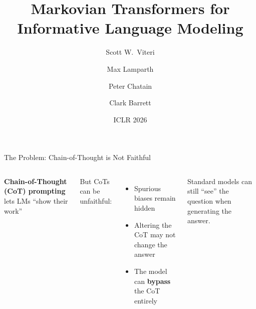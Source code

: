 \documentclass[aspectratio=169]{beamer}
\title{Markovian Transformers for\\Informative Language Modeling}
\author{Scott W.\ Viteri \and Max Lamparth \and Peter Chatain \and Clark Barrett}
\institute{Department of Computer Science, Stanford University}
\date{ICLR 2026}
\begin{document}
\begin{frame}[plain]
\maketitle
\end{frame}

\begin{frame}{The Problem: Chain-of-Thought is Not Faithful}

\begin{columns}[T]
\textbf{Chain-of-Thought (CoT) prompting} lets LMs ``show their work''
\citep{wei2022chain, nye2022show}

\bigskip
But CoTs can be \alert{unfaithful}:
\begin{itemize}
    \item Spurious biases remain hidden \citep{turpin2023language}
    \item Altering the CoT may not change the answer \citep{lanham2023measuring}
    \item The model can \textbf{bypass} the CoT entirely
\end{itemize}


\vspace{0.3cm}
{\small\color{red} Standard models can still ``see'' the question when generating the answer.}
\end{columns}
\end{frame}
\end{document}
